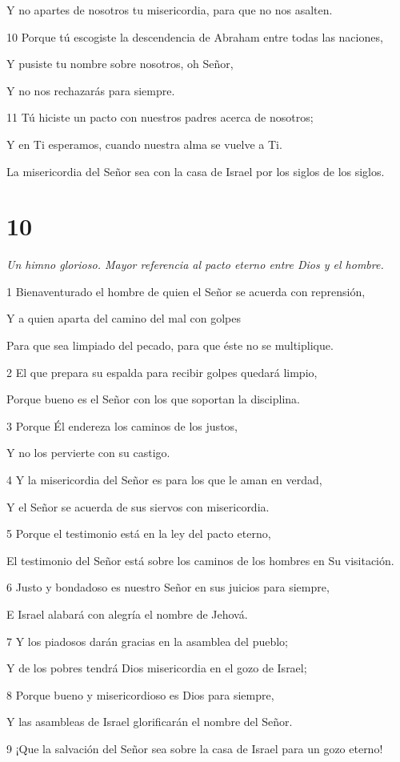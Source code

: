 \par     Y no apartes de nosotros tu misericordia, para que no nos asalten.
\par 10 Porque tú escogiste la descendencia de Abraham entre todas las naciones,
\par     Y pusiste tu nombre sobre nosotros, oh Señor,
\par     Y no nos rechazarás para siempre.
\par 11 Tú hiciste un pacto con nuestros padres acerca de nosotros;
\par     Y en Ti esperamos, cuando nuestra alma se vuelve a Ti.
\par     La misericordia del Señor sea con la casa de Israel por los siglos de los siglos.

\chapter{10}

\par \textit{Un himno glorioso. Mayor referencia al pacto eterno entre Dios y el hombre.}

\par 1 Bienaventurado el hombre de quien el Señor se acuerda con reprensión,
\par     Y a quien aparta del camino del mal con golpes
\par     Para que sea limpiado del pecado, para que éste no se multiplique.
\par 2 El que prepara su espalda para recibir golpes quedará limpio,
\par     Porque bueno es el Señor con los que soportan la disciplina.
\par 3 Porque Él endereza los caminos de los justos,
\par     Y no los pervierte con su castigo.
\par 4 Y la misericordia del Señor es para los que le aman en verdad,
\par     Y el Señor se acuerda de sus siervos con misericordia.
\par 5 Porque el testimonio está en la ley del pacto eterno,
\par     El testimonio del Señor está sobre los caminos de los hombres en Su visitación.
\par 6 Justo y bondadoso es nuestro Señor en sus juicios para siempre,
\par     E Israel alabará con alegría el nombre de Jehová.
\par 7 Y los piadosos darán gracias en la asamblea del pueblo;
\par     Y de los pobres tendrá Dios misericordia en el gozo de Israel;
\par 8 Porque bueno y misericordioso es Dios para siempre,
\par     Y las asambleas de Israel glorificarán el nombre del Señor.
\par   
\par 9 ¡Que la salvación del Señor sea sobre la casa de Israel para un gozo eterno!

